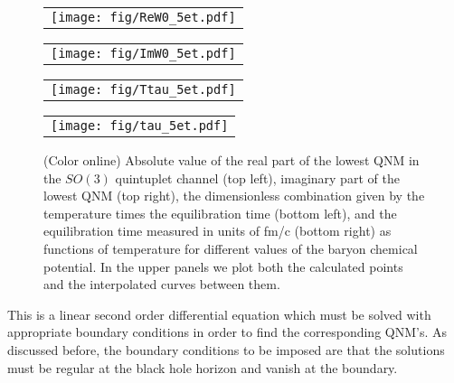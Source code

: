 \documentclass[aps,prd,showkeys,superscriptaddress,singlecolumn,nofootinbib,floatfix]{revtex4-1}
\begin{document}
\begin{figure*}
\begin{center}
\begin{tabular}{c}
\texttt{[image: fig/ReW0\_5et.pdf]} %
\end{tabular}
\begin{tabular}{c}
\texttt{[image: fig/ImW0\_5et.pdf]} %
\end{tabular}
\begin{tabular}{c}
\texttt{[image: fig/Ttau\_5et.pdf]} %
\end{tabular}
\begin{tabular}{c}
\texttt{[image: fig/tau\_5et.pdf]} %
\end{tabular}
\end{center}
\caption{{\small (Color online) Absolute value of the real part of the lowest QNM in the $SO(3)$ quintuplet channel (top left), imaginary part of the lowest QNM (top right), the dimensionless combination given by the temperature times the equilibration time (bottom left), and the equilibration time measured in units of fm/c (bottom right) as functions of temperature for different values of the baryon chemical potential. In the upper panels we plot both the calculated points and the interpolated curves between them.}
\label{fig:5et}}
\end{figure*}

This is a linear second order differential equation which must be solved with appropriate boundary conditions in order to find the corresponding QNM's. As discussed before, the boundary conditions to be imposed are that the solutions must be regular at the black hole horizon and vanish at the boundary.
\end{document}

